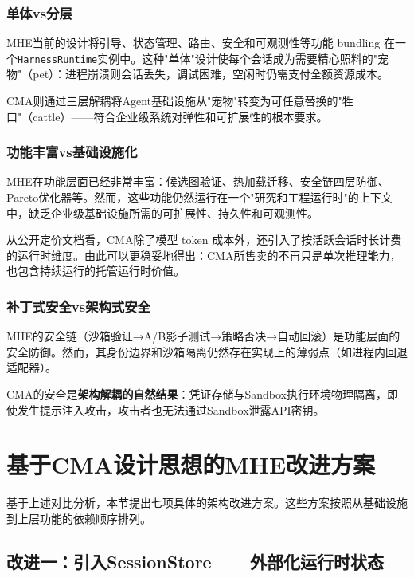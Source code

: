 \documentclass[12pt,a4paper]{ctexart}
\begin{document}
\subsubsection{单体vs分层}

MHE当前的设计将引导、状态管理、路由、安全和可观测性等功能 bundling 在一个\texttt{HarnessRuntime}实例中。这种"单体"设计使每个会话成为需要精心照料的"宠物"（pet）：进程崩溃则会话丢失，调试困难，空闲时仍需支付全额资源成本。

CMA则通过三层解耦将Agent基础设施从"宠物"转变为可任意替换的"牲口"（cattle）——符合企业级系统对弹性和可扩展性的根本要求。

\subsubsection{功能丰富vs基础设施化}

MHE在功能层面已经非常丰富：候选图验证、热加载迁移、安全链四层防御、Pareto优化器等。然而，这些功能仍然运行在一个"研究和工程运行时"的上下文中，缺乏企业级基础设施所需的可扩展性、持久性和可观测性。

从公开定价文档看，CMA除了模型 token 成本外，还引入了按活跃会话时长计费的运行时维度。由此可以更稳妥地得出：CMA所售卖的不再只是单次推理能力，也包含持续运行的托管运行时价值。

\subsubsection{补丁式安全vs架构式安全}

MHE的安全链（沙箱验证→A/B影子测试→策略否决→自动回滚）是功能层面的安全防御。然而，其身份边界和沙箱隔离仍然存在实现上的薄弱点（如进程内回退适配器）。

CMA的安全是\textbf{架构解耦的自然结果}：凭证存储与Sandbox执行环境物理隔离，即使发生提示注入攻击，攻击者也无法通过Sandbox泄露API密钥。

\section{基于CMA设计思想的MHE改进方案}\label{sec:improvements}

基于上述对比分析，本节提出七项具体的架构改进方案。这些方案按照从基础设施到上层功能的依赖顺序排列。

\subsection{改进一：引入SessionStore——外部化运行时状态}
\end{document}
